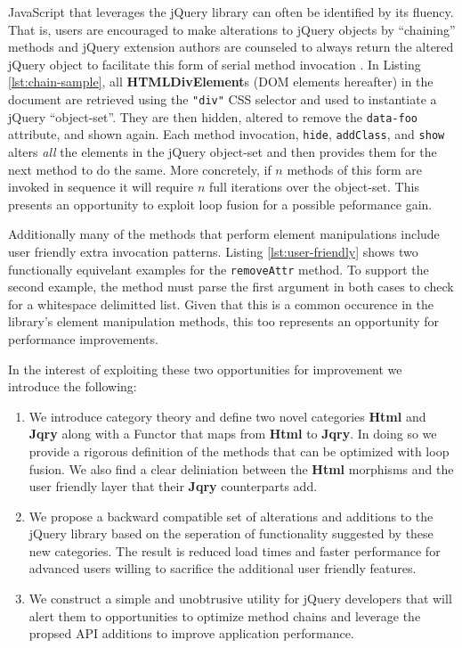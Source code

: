 \documentclass[preprint]{sigplanconf}
\begin{document}
JavaScript that leverages the jQuery library can often be identified by its fluency. That is, users are encouraged to make alterations to jQuery objects by ``chaining'' methods and jQuery extension authors are counseled to always return the altered jQuery object to facilitate this form of serial method invocation \cite{bib:chaining}. In Listing \ref{lst:chain-sample}, all \textbf{HTMLDivElement}s (DOM elements hereafter) in the document are retrieved using the \verb|"div"| CSS selector and used to instantiate a jQuery ``object-set''. They are then hidden, altered to remove the \verb|data-foo| attribute, and shown again. Each method invocation, \verb|hide|, \verb|addClass|, and \verb|show| alters \textit{all} the elements in the jQuery object-set and then provides them for the next method to do the same. More concretely, if \begin{math}n\end{math} methods of this form are invoked in sequence it will require \begin{math}n\end{math} full iterations over the object-set. This presents an opportunity to exploit loop fusion for a possible peformance gain.

Additionally many of the methods that perform element manipulations include user friendly extra invocation patterns. Listing \ref{lst:user-friendly} shows two functionally equivelant examples for the \verb|removeAttr| method. To support the second example, the method must parse the first argument in both cases to check for a whitespace delimitted list. Given that this is a common occurence in the library's element manipulation methods, this too represents an opportunity for performance improvements.

In the interest of exploiting these two opportunities for improvement we introduce the following:

\begin{enumerate}
\item We introduce category theory and define two novel categories \textbf{Html} and \textbf{Jqry} along with a Functor that maps from \textbf{Html} to \textbf{Jqry}. In doing so we provide a rigorous definition of the methods that can be optimized with loop fusion. We also find a clear deliniation between the \textbf{Html} morphisms and the user friendly layer that their \textbf{Jqry} counterparts add.
\item We propose a backward compatible set of alterations and additions to the jQuery library based on the seperation of functionality suggested by these new categories. The result is reduced load times and faster performance for advanced users willing to sacrifice the additional user friendly features.
\item We construct a simple and unobtrusive utility for jQuery developers that will alert them to opportunities to optimize method chains and leverage the propsed API additions to improve application performance.
\end{enumerate}
\end{document}
